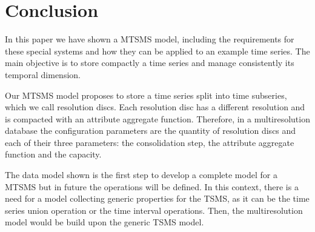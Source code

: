 \section{Conclusion} 
\label{sec:concl-future-work}

In this paper we have shown a MTSMS model, including the requirements
for these special systems and how they can be applied to an example
time series. The main objective is to store compactly a time series
and manage consistently its temporal dimension.

Our MTSMS model proposes to store a time series split into time
subseries, which we call resolution discs.  Each resolution disc has a
different resolution and is compacted with an attribute aggregate
function. Therefore, in a multiresolution database the configuration
parameters are the quantity of resolution discs and each of their three
parameters: the consolidation step, the attribute
aggregate function and the capacity.

The data model shown is the first step to develop a complete model for
a MTSMS but in future the operations will be defined. In this context,
there is a need for a model collecting generic properties for the
TSMS, as it can be the time series union operation or the time
interval operations. Then, the multiresolution model would be build
upon the generic TSMS model.





